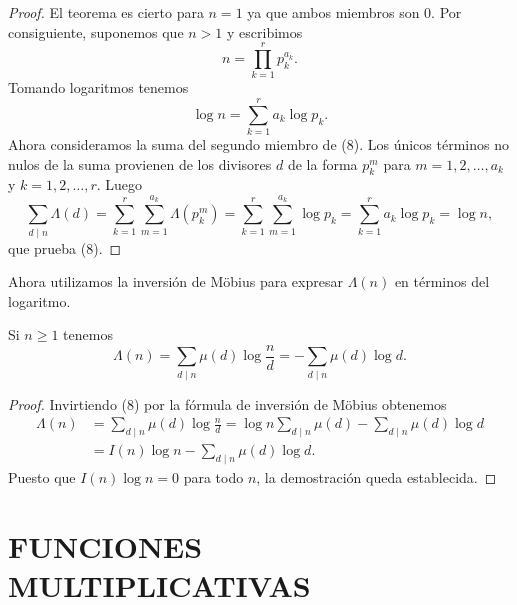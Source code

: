 \documentclass[12pt,a4paper]{book}
\begin{document}
    \begin{proof}
        El teorema es cierto para $n=1$ ya que ambos miembros son 0. Por consiguiente,
        suponemos que $n>1$ y escribimos
        \begin{equation*}
            n=\prod_{k=1}^{r}p_k^{a_k}.
        \end{equation*}
        Tomando logaritmos tenemos
        \begin{equation*}
            \log n=\sum_{k=1}^{r}a_k\log p_k.
        \end{equation*}
        Ahora consideramos la suma del segundo miembro de (8). Los únicos términos no nulos
        de la suma provienen de los divisores $d$ de la forma $p_k^m$ para
        $m=1,2,\dots,a_k$ y $k=1,2,\dots,r$. Luego
        \begin{equation*}
            \sum_{d\mid n}\Lambda(d)=\sum_{k=1}^{r}\sum_{m=1}^{a_k}\Lambda(p_k^m)
            =\sum_{k=1}^{r}\sum_{m=1}^{a_k}\log p_k=\sum_{k=1}^{r}a_k\log p_k=\log n,
        \end{equation*}
        que prueba (8).
    \end{proof}

    Ahora utilizamos la inversión de Möbius para expresar $\Lambda(n)$ en términos del
    logaritmo.

    \begin{teorema}
        Si $n\geq1$ tenemos
        \begin{equation*}
            \Lambda(n)=\sum_{d\mid n}\mu(d)\log\frac{n}{d}=-\sum_{d\mid n}\mu(d)\log d.
        \end{equation*}
    \end{teorema}

    \begin{proof}
        Invirtiendo (8) por la fórmula de inversión de Möbius obtenemos
        \begin{align*}
            \Lambda(n)&=\sum_{d\mid n}\mu(d)\log\frac{n}{d}
            =\log n\sum_{d\mid n}\mu(d)-\sum_{d\mid n}\mu(d)\log d\\
            &=I(n)\log n-\sum_{d\mid n}\mu(d)\log d.
        \end{align*}
        Puesto que $I(n)\log n=0$ para todo $n$, la demostración queda establecida.
    \end{proof}

    \section{FUNCIONES MULTIPLICATIVAS}
\end{document}
